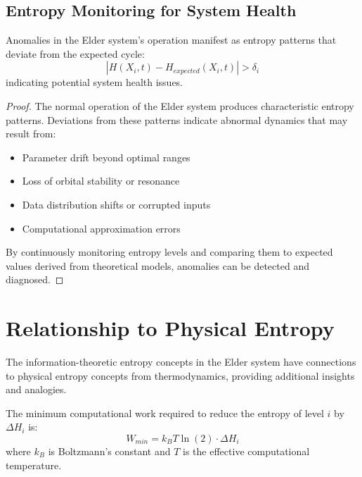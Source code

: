 \subsection{Entropy Monitoring for System Health}

\begin{theorem}
Anomalies in the Elder system's operation manifest as entropy patterns that deviate from the expected cycle:
\begin{equation}
|H(X_i, t) - H_{expected}(X_i, t)| > \delta_i
\end{equation}
indicating potential system health issues.
\end{theorem}

\begin{proof}
The normal operation of the Elder system produces characteristic entropy patterns. Deviations from these patterns indicate abnormal dynamics that may result from:
\begin{itemize}
    \item Parameter drift beyond optimal ranges
    \item Loss of orbital stability or resonance
    \item Data distribution shifts or corrupted inputs
    \item Computational approximation errors
\end{itemize}

By continuously monitoring entropy levels and comparing them to expected values derived from theoretical models, anomalies can be detected and diagnosed.
\end{proof}

\section{Relationship to Physical Entropy}

The information-theoretic entropy concepts in the Elder system have connections to physical entropy concepts from thermodynamics, providing additional insights and analogies.

\begin{theorem}
The minimum computational work required to reduce the entropy of level $i$ by $\Delta H_i$ is:
\begin{equation}
W_{min} = k_B T \ln(2) \cdot \Delta H_i
\end{equation}
where $k_B$ is Boltzmann's constant and $T$ is the effective computational temperature.
\end{theorem}

